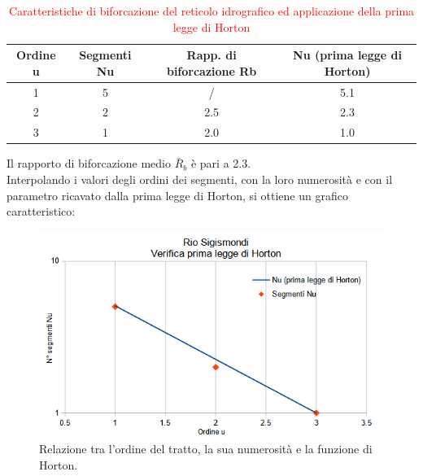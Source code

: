 \begin{table}[H] \centering
    \caption{\textcolor{red}{Caratteristiche di biforcazione del reticolo idrografico ed applicazione della prima legge di Horton}}
    \label{tab:rapp_biforcazione_1_horton}
    \begin{tabular}{ cccc }
\toprule
    Ordine u & Segmenti Nu & Rapp. di biforcazione Rb & Nu (prima legge di Horton) \\
\midrule    
    1        & 5           &   /                     & 5.1                        \\
    2        & 2           & 2.5                      & 2.3                        \\
    3        & 1           & 2.0                      & 1.0                       \\
\bottomrule    
\end{tabular}
\end{table}
Il rapporto di biforcazione medio $\bar{R}_b$ è pari a 2.3.\\
Interpolando i valori degli ordini dei segmenti, con la loro numerosità e con il parametro ricavato dalla prima legge di Horton, si ottiene un grafico caratteristico:
\begin{figure}[H]\centering
    \includegraphics[scale=.75]{immagini/legge_horton.png}
    \caption{Relazione tra l'ordine del tratto, la sua numerosità e la funzione di Horton.}
    \label{legge_horton}
\end{figure}

